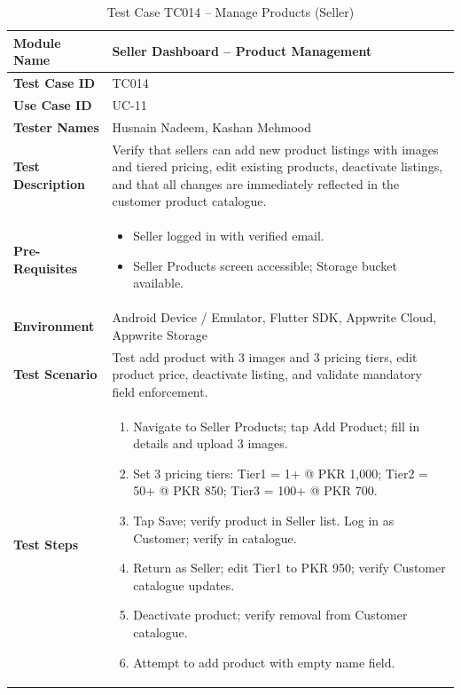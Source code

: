 \begin{table}[H]
\centering
\caption{Test Case TC014 -- Manage Products (Seller)}
\label{tab:tc014}
\renewcommand{\arraystretch}{1.15}
\small
\begin{tabular}{|p{3.2cm}|p{10.8cm}|}
\hline
\textbf{Module Name} & Seller Dashboard -- Product Management \\ \hline
\textbf{Test Case ID} & TC014 \\ \hline
\textbf{Use Case ID} & UC-11 \\ \hline
\textbf{Tester Names} & Husnain Nadeem, Kashan Mehmood \\ \hline
\textbf{Test Description} & Verify that sellers can add new product listings with images and tiered pricing, edit existing products, deactivate listings, and that all changes are immediately reflected in the customer product catalogue. \\ \hline
\textbf{Pre-Requisites} &
\begin{itemize}[leftmargin=*,noitemsep]
\item Seller logged in with verified email.
\item Seller Products screen accessible; Storage bucket available.
\end{itemize} \\ \hline
\textbf{Environment} & Android Device / Emulator, Flutter SDK, Appwrite Cloud, Appwrite Storage \\ \hline
\textbf{Test Scenario} & Test add product with 3 images and 3 pricing tiers, edit product price, deactivate listing, and validate mandatory field enforcement. \\ \hline
\textbf{Test Steps} &
\begin{enumerate}[leftmargin=*,noitemsep]
\item Navigate to Seller Products; tap Add Product; fill in details and upload 3 images.
\item Set 3 pricing tiers: Tier1 = 1+ @ PKR 1,000; Tier2 = 50+ @ PKR 850; Tier3 = 100+ @ PKR 700.
\item Tap Save; verify product in Seller list. Log in as Customer; verify in catalogue.
\item Return as Seller; edit Tier1 to PKR 950; verify Customer catalogue updates.
\item Deactivate product; verify removal from Customer catalogue.
\item Attempt to add product with empty name field.
\end{enumerate} \\ \hline

\end{tabular}
\end{table}
